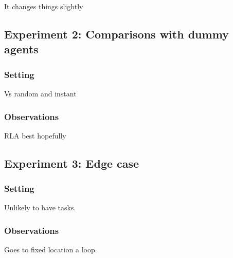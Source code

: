 \documentclass[11pt]{article}
\begin{document}
It changes things slightly

\subsection{Experiment 2: Comparisons with dummy agents}

\subsubsection{Setting}

Vs random and instant

\subsubsection{Observations}

RLA best hopefully

\subsection{Experiment 3: Edge case}
\subsubsection{Setting}

Unlikely to have tasks.

\subsubsection{Observations}

Goes to fixed location a loop.
\end{document}
